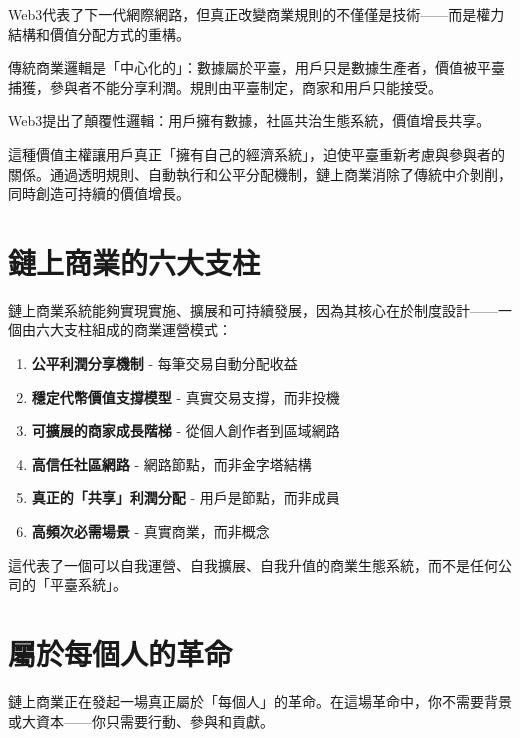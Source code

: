 \documentclass[
  Letterpaper,
]{scrbook}
\providecommand{\tightlist}{%
  \setlength{\itemsep}{0pt}\setlength{\parskip}{0pt}}
\begin{document}
Web3代表了下一代網際網路，但真正改變商業規則的不僅僅是技術------而是權力結構和價值分配方式的重構。

傳統商業邏輯是「中心化的」：數據屬於平臺，用戶只是數據生產者，價值被平臺捕獲，參與者不能分享利潤。規則由平臺制定，商家和用戶只能接受。

Web3提出了顛覆性邏輯：用戶擁有數據，社區共治生態系統，價值增長共享。

這種價值主權讓用戶真正「擁有自己的經濟系統」，迫使平臺重新考慮與參與者的關係。通過透明規則、自動執行和公平分配機制，鏈上商業消除了傳統中介剝削，同時創造可持續的價值增長。

\section*{鏈上商業的六大支柱}\label{ux93c8ux4e0aux5546ux696dux7684ux516dux5927ux652fux67f1}


鏈上商業系統能夠實現實施、擴展和可持續發展，因為其核心在於制度設計------一個由六大支柱組成的商業運營模式：

\begin{enumerate}
\def\labelenumi{\arabic{enumi}.}
\tightlist
\item
  \textbf{公平利潤分享機制} - 每筆交易自動分配收益
\item
  \textbf{穩定代幣價值支撐模型} - 真實交易支撐，而非投機
\item
  \textbf{可擴展的商家成長階梯} - 從個人創作者到區域網路
\item
  \textbf{高信任社區網路} - 網路節點，而非金字塔結構
\item
  \textbf{真正的「共享」利潤分配} - 用戶是節點，而非成員
\item
  \textbf{高頻次必需場景} - 真實商業，而非概念
\end{enumerate}

這代表了一個可以自我運營、自我擴展、自我升值的商業生態系統，而不是任何公司的「平臺系統」。

\section*{屬於每個人的革命}\label{ux5c6cux65bcux6bcfux500bux4ebaux7684ux9769ux547d}


鏈上商業正在發起一場真正屬於「每個人」的革命。在這場革命中，你不需要背景或大資本------你只需要行動、參與和貢獻。
\end{document}
